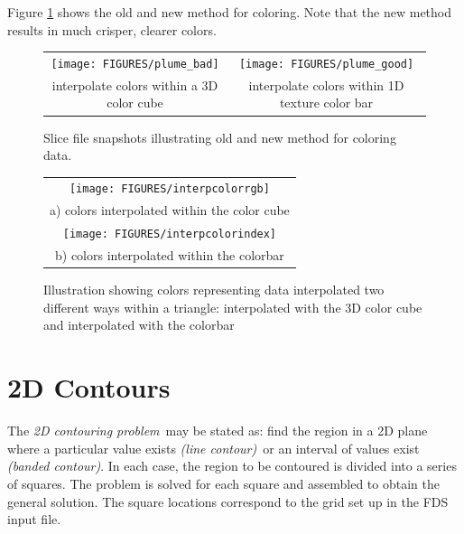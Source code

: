 \documentclass[11pt,twoside]{book}
\newcommand{\figoptions}{htp}
\begin{document}
Figure \ref{fignewslice} shows the old and new method for coloring.  Note that the new method results in much crisper, clearer colors.
\begin{figure}[\figoptions]
\begin{center}
\begin{tabular}{cc}
\texttt{[image: FIGURES/plume\_bad]}&\texttt{[image: FIGURES/plume\_good]}\\
interpolate colors within a 3D color cube&interpolate colors within 1D texture color bar\\
\end{tabular}
\caption [Slice file snapshots illustrating old and new method for
coloring data.] {Slice file snapshots illustrating old and new
method for coloring data.}
\label{fignewslice}%
\end{center}
\end{figure}



\begin{figure}[\figoptions]
\begin{center}
\begin{tabular}{c}
\texttt{[image: FIGURES/interpcolorrgb]}\\
a) colors interpolated within the color cube\\
\texttt{[image: FIGURES/interpcolorindex]}\\
b) colors interpolated within the colorbar\\
\end{tabular}
\end{center}
\caption[Color interpolation examples]
{Illustration showing colors representing data interpolated two different ways within a triangle: interpolated with the 3D color cube and interpolated with the colorbar}
\label{colorinterp}%
\end{figure}

%
%

\section{2D Contours}

The {\em 2D contouring problem}\ may be stated as: find the region in a 2D plane where a particular value exists {\em (line contour)}\ or an interval of values exist {\em (banded contour)}.   In each case, the  region to be contoured is divided into a series of squares.  The problem is solved for each square and assembled to obtain the general solution.  The square locations correspond to the grid set up in the FDS input file.
\end{document}
